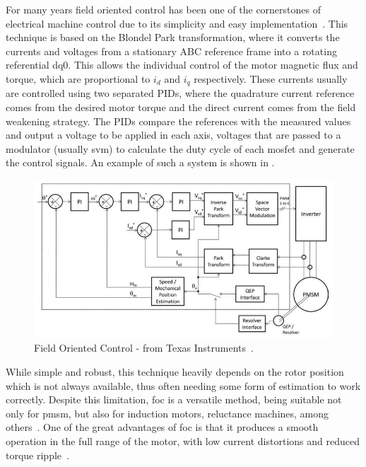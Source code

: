 For many years field oriented control has been one of the cornerstones of electrical machine control due to its simplicity and easy implementation~\cite{Doncker:Universal_FOC:1994}. This technique is based on the Blondel Park transformation, where it converts the currents and voltages from a stationary ABC reference frame into a rotating referential dq0. This allows the individual control of the motor magnetic flux and torque, which are proportional to $i_d$ and $i_q$ respectively. These currents usually are controlled using two separated PIDs, where the quadrature current reference comes from the desired motor torque and the direct current comes from the field weakening strategy. The PIDs compare the references with the measured values and output a voltage to be applied in each axis, voltages that are passed to a modulator (usually \gls{svm}) to calculate the duty cycle of each \gls{mosfet} and generate the control signals. An example of such a system is shown in .
\begin{figure}[!htb]
	\centering
	\includegraphics[width=1\textwidth]{Figures/foc_texas_instruments.jpg}
	\caption[Field Oriented Control - from Texas Instruments~\cite{TI:FOC_TMS320F2837:2016}.]{Field Oriented Control - from Texas Instruments~\cite{TI:FOC_TMS320F2837:2016}.}
	\label{fig:example_PID} %
\end{figure}

While simple and robust, this technique heavily depends on the rotor position which is not always available, thus often needing some form of estimation to work correctly. Despite this limitation, \gls{foc} is a versatile method, being suitable not only for \gls{pmsm}, but also for induction motors, reluctance machines, among others~\cite{Hoang:FOC_vs_DTC_induction:1999,Matsuo:FOC_reluctance:1993}. One of the great advantages of \gls{foc} is that it produces a smooth operation in the full range of the motor, with low current distortions and reduced torque ripple~\cite{Adhavan:FOC_fuzzy:2011}.



